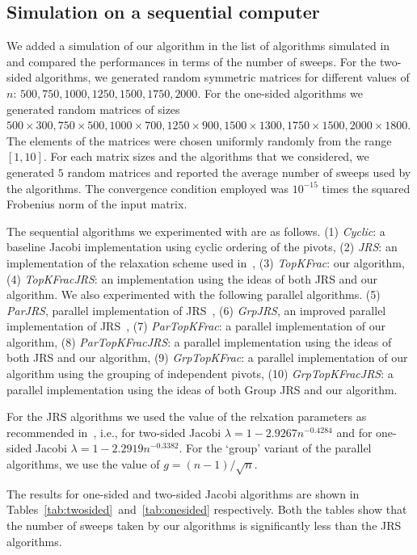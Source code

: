 \documentclass[10pt, conference, compsocconf]{IEEEtran}
\begin{document}
\subsection{Simulation on a sequential computer}

We added a simulation of our algorithm in the list of algorithms simulated in~\cite{rajasekaran2008relaxation} and compared the performances in terms of the number
of sweeps. For the two-sided algorithms, we generated random symmetric matrices for different values of $n$: $500, 750, 1000, 1250, 1500, 1750, 2000$. For the one-sided algorithms we generated random matrices of sizes $500 \times 300, 750 \times 500, 1000 \times 700, 1250 \times 900, 1500 \times 1300, 1750 \times 1500, 2000 \times 1800$.  The elements of the matrices were chosen uniformly randomly from the range $[1,10]$. For each matrix sizes and the algorithms that we considered, we generated $5$ random matrices and reported the average number of sweeps used by the algorithms. The convergence condition employed was $10^{-15}$ times the squared Frobenius norm of the input matrix.

The sequential algorithms we experimented with are as follows. (1) \emph{Cyclic}:  a baseline Jacobi implementation using cyclic ordering of the pivots, (2) \emph{JRS}: an implementation of the relaxation scheme used in~\cite{rajasekaran2008relaxation}, (3) \emph{TopKFrac}: our algorithm, (4) \emph{TopKFracJRS}: an implementation using the ideas of both JRS and our algorithm. We also experimented with the following parallel algorithms. (5) \emph{ParJRS}, parallel implementation of JRS~\cite{rajasekaran2008relaxation}, (6) \emph{GrpJRS}, an improved parallel implementation of JRS~\cite{rajasekaran2008relaxation}, (7) \emph{ParTopKFrac}: a parallel implementation of our algorithm, (8) \emph{ParTopKFracJRS}: a parallel implementation using the ideas of both JRS and our algorithm, (9)   \emph{GrpTopKFrac}: a parallel implementation of our algorithm using the grouping of independent pivots, (10) \emph{GrpTopKFracJRS}: a parallel implementation using the ideas of both Group JRS and our algorithm.

For the JRS algorithms we used the value of the relxation parameters as recommended in~\cite{rajasekaran2008relaxation}, i.e., for two-sided Jacobi $\lambda = 1- 2.9267n^{-0.4284}$ and for one-sided Jacobi $\lambda = 1 - 2.2919 n^{-0.3382}$. For the `group' variant of the parallel algorithms, we use the value of $g = (n-1)/\sqrt{n}$. 

The results for one-sided and two-sided Jacobi algorithms are shown in Tables~\ref{tab:twosided}~and~\ref{tab:onesided} respectively. Both the tables show that the number of sweeps taken by our algorithms is significantly less than the JRS algorithms.
\end{document}
